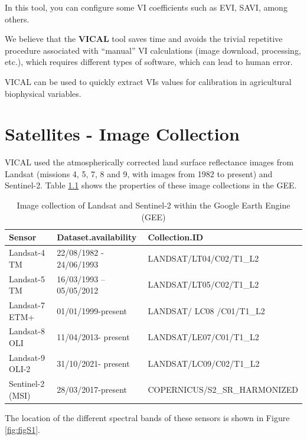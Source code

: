 \documentclass[
]{book}
\begin{document}
In this tool, you can configure some VI coefficients such as EVI, SAVI, among others.

We believe that the \textbf{VICAL} tool saves time and avoids the trivial repetitive procedure associated with ``manual'' VI calculations (image download, processing, etc.), which requires different types of software, which can lead to human error.

VICAL can be used to quickly extract VIs values for calibration in agricultural biophysical variables.

\hypertarget{Sat}{%
\chapter{Satellites - Image Collection}\label{Sat}}

VICAL used the atmospherically corrected land surface reflectance images from Landsat (missions 4, 5, 7, 8 and 9, with images from 1982 to present) and Sentinel-2. Table \ref{tab:Sat} shows the properties of these image collections in the GEE.

\begin{table}

\caption{\label{tab:Sat}Image collection of Landsat and Sentinel-2 within the Google Earth Engine (GEE)}
\centering
\begin{tabular}[t]{lll}
\toprule
Sensor & Dataset.availability & Collection.ID\\
\midrule
Landsat-4 TM & 22/08/1982 - 24/06/1993 & LANDSAT/LT04/C02/T1\_L2\\
Landsat-5 TM & 16/03/1993 – 05/05/2012 & LANDSAT/LT05/C02/T1\_L2\\
Landsat-7 ETM+ & 01/01/1999-present & LANDSAT/ LC08 /C01/T1\_L2\\
Landsat-8 OLI & 11/04/2013- present & LANDSAT/LE07/C01/T1\_L2\\
Landsat-9 OLI-2 & 31/10/2021- present & LANDSAT/LC09/C02/T1\_L2\\
\addlinespace
Sentinel-2 (MSI) & 28/03/2017-present & COPERNICUS/S2\_SR\_HARMONIZED\\
\bottomrule
\end{tabular}
\end{table}

The location of the different spectral bands of these sensors is shown in Figure \ref{fig:figS1}.
\end{document}
